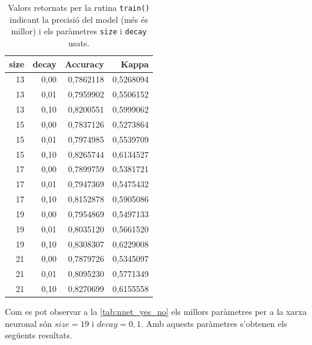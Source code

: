 \documentclass[a4paper]{article}
\begin{document}
\begin{table}[H]
	\centering
	\def\arraystretch{1.2}
	\begin{tabular}{|rrrr|}
		\hline
		size & decay & Accuracy & Kappa \\
		\hline
		13 & 0,00 & 0,7862118 & 0,5268094 \\
		13 & 0,01 & 0,7959902 & 0,5506152 \\
		13 & 0,10 & 0,8200551 & 0,5999062 \\
		15 & 0,00 & 0,7837126 & 0,5273864 \\
		15 & 0,01 & 0,7974985 & 0,5539709 \\
		15 & 0,10 & 0,8265744 & 0,6134527 \\
		17 & 0,00 & 0,7899759 & 0,5381721 \\
		17 & 0,01 & 0,7947369 & 0,5475432 \\
		17 & 0,10 & 0,8152878 & 0,5905086 \\
		19 & 0,00 & 0,7954869 & 0,5497133 \\
		19 & 0,01 & 0,8035120 & 0,5661520 \\
		\rowcolor{Orange!40}
		19 & 0,10 & 0,8308307 & 0,6229008 \\
		21 & 0,00 & 0,7879726 & 0,5345097 \\
		21 & 0,01 & 0,8095230 & 0,5771349 \\
		21 & 0,10 & 0,8270699 & 0,6155558 \\
		\hline
	\end{tabular}
	\captionsetup{width=0.6\textwidth}
	\caption{Valors retornats per la rutina \texttt{train()} indicant la precisió del model (més és millor) i els paràmetres \texttt{size} i \texttt{decay} usats.}
	\label{tab:nnet_yes_no}
\end{table}

Com es pot observar a la \autoref{tab:nnet_yes_no} els millors paràmetres per a la xarxa neuronal són $size = 19$ i $decay = 0,1$. Amb aquests paràmetres s'obtenen els següents resultats.
\end{document}
